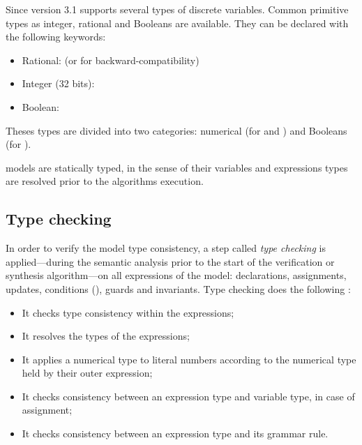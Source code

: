 Since version 3.1 \imitator{} supports several types of discrete variables.
Common primitive types as integer, rational and Booleans are available.
They can be declared with the following keywords:

\begin{itemize}
	\item Rational:  (or  for backward-compatibility)
	\item Integer (32 bits): 
	\item Boolean: 
\end{itemize}

Theses types are divided into two categories: numerical (for  and ) and Booleans (for ).

\imitator{} models are statically typed, in the sense of their variables and expressions types are resolved prior to the algorithms execution.


\subsection{Type checking}

In order to verify the model type consistency, a step called \emph{type checking} is applied---during the semantic analysis prior to the start of the verification or synthesis algorithm---on all expressions of the model: declarations, assignments, updates, conditions (), guards and invariants.
Type checking does the following :

\begin{itemize}
	\item It checks type consistency within the expressions;
	\item It resolves the types of the expressions;
	\item It applies a numerical type to literal numbers according to the numerical type held by their outer expression;
	\item It checks consistency between an expression type and variable type, in case of assignment;
	\item It checks consistency between an expression type and its grammar rule.
\end{itemize}

